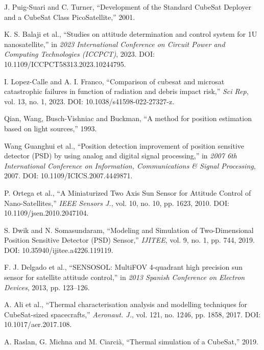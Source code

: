\begin{thebibliography}{99}

 J. Puig-Suari and C. Turner, ``Development of the Standard CubeSat Deployer and a CubeSat Class PicoSatellite,'' 2001.

 K. S. Balaji et al., ``Studies on attitude determination and control system for 1U nanosatellite,'' in \textit{2023 International Conference on Circuit Power and Computing Technologies (ICCPCT)}, 2023. DOI: 10.1109/ICCPCT58313.2023.10244795.

 I. Lopez-Calle and A. I. Franco, ``Comparison of cubesat and microsat catastrophic failures in function of radiation and debris impact risk,'' \textit{Sci Rep}, vol. 13, no. 1, 2023. DOI: 10.1038/s41598-022-27327-z.

 Qian, Wang, Busch-Vishniac and Buckman, ``A method for position estimation based on light sources,'' 1993.

 Wang Guanghui et al., ``Position detection improvement of position sensitive detector (PSD) by using analog and digital signal processing,'' in \textit{2007 6th International Conference on Information, Communications \& Signal Processing}, 2007. DOI: 10.1109/ICICS.2007.4449871.

 P. Ortega et al., ``A Miniaturized Two Axis Sun Sensor for Attitude Control of Nano-Satellites,'' \textit{IEEE Sensors J.}, vol. 10, no. 10, pp. 1623, 2010. DOI: 10.1109/jsen.2010.2047104.

 S. Dwik and N. Somasundaram, ``Modeling and Simulation of Two-Dimensional Position Sensitive Detector (PSD) Sensor,'' \textit{IJITEE}, vol. 9, no. 1, pp. 744, 2019. DOI: 10.35940/ijitee.a4226.119119.

 F. J. Delgado et al., ``SENSOSOL: MultiFOV 4-quadrant high precision sun sensor for satellite attitude control,'' in \textit{2013 Spanish Conference on Electron Devices}, 2013, pp. 123--126.

 A. Ali et al., ``Thermal characterisation analysis and modelling techniques for CubeSat-sized spacecrafts,'' \textit{Aeronaut. J.}, vol. 121, no. 1246, pp. 1858, 2017. DOI: 10.1017/aer.2017.108.

 A. Raslan, G. Michna and M. Ciarcià, ``Thermal simulation of a CubeSat,'' 2019.


\end{thebibliography}
